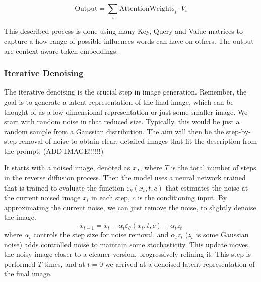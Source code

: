\documentclass[11pt]{article}
\begin{document}
    $$\mathrm{Output} = \sum_i \mathrm{Attention Weights}_i \cdot V_i$$

    This described process is done using many Key, Query and Value matrices to capture a how range of possible influences words can have on others. The output are context aware token embeddings.
\fi

\subsubsection{Iterative Denoising}
The iterative denoising is the crucial step in image generation. Remember, the goal is to generate a latent representation of the final image, which can be thought of as a low-dimensional representation or just some smaller image. We start with random noise in that reduced size. Typically, this would be just a random sample from a Gaussian distribution. The aim will then be the step-by-step removal of noise to obtain clear, detailed images that fit the description from the prompt. (ADD IMAGE!!!!!!)

It starts with a noised image, denoted as $x_T$, where $T$ is the total number of steps in the reverse diffusion process. Then the model uses a neural network trained that is trained to evaluate the function $\varepsilon_\theta(x_t,t,c)$ that estimates the noise at the current noised image $x_t$ in each step, $c$ is the conditioning input. By approximating the current noise, we can just remove the noise, to slightly denoise the image.
$$x_{t-1}=x_t-\alpha_t \varepsilon_\theta(x_t,t,c)+ \alpha_t z_t$$
where $\alpha_t$ controls the step size for noise removal, and $\alpha_t z_t$  ($z_t$ is some Gaussian noise) adds controlled noise to maintain some stochasticity. This update moves the noisy image closer to a cleaner version, progressively refining it. This step is performed $T$-times, and at $t=0$ we arrived at a denoised latent representation of the final image.
\end{document}
